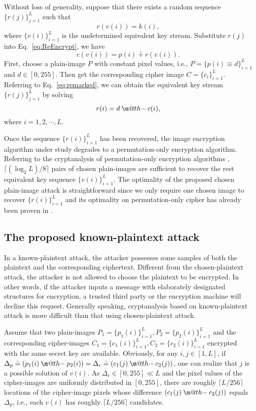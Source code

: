 \documentclass[smallextended, final]{svjour3}          \smartqed
\makeatletter
\newcommand{\dotminus}{\mathbin{\text{\@dotminus}}}
\newcommand{\@dotminus}{\ooalign{\hidewidth\raise1ex\hbox{.}\hidewidth\cr$\m@th-$\cr}}
\makeatother
\begin{document}
Without loss of generality, suppose that there exists a random sequence $\{r(j)\}_{j=1}^{L}$ such that
\begin{equation*}
r(v(i)) = k(i),
\end{equation*}
where $\{v(i)\}_{i=1}^{L}$ is the undetermined equivalent key stream. Substitute $r(j)$ into Eq.~\eqref{eq:ReEncrypt},
we have
\begin{equation}
\label{eq:remarked}
c(v(i)) = p(i) \dotplus r(v(i)).
\end{equation}
First, choose a plain-image $P$ with constant pixel values, i.e., $P = \{p(i)\equiv d\}_{i=1}^{L}$ and $d\in [0, 255]$. Then
get the corresponding cipher image $C=\{c_i\}_{i=1}^{L}$.
Referring to Eq.~\eqref{eq:remarked}, we can obtain the equivalent key stream $\{r(j)\}_{j=1}^{L}$ by solving
\begin{equation}
\nonumber
r(i) = d \dotminus c(i),
\end{equation}
where $i =1,2,\cdots, L$.

Once the sequence $\{r(i)\}_{i=1}^{L}$ has been recovered, the image encryption algorithm under study degrades to a
permutation-only encryption algorithm. Referring to the cryptanalysis
of permutation-only encryption algorithms \cite{li2008general, li2011optimal},
$\lceil (\log_2L)/8\rceil$ pairs of chosen plain-images are sufficient to recover the rest equivalent key sequence $\{v(i)\}_{i=1}^{L}$.
The optimality of the proposed chosen plain-image attack is straightforward since we only require one chosen image to recover $\{r(i)\}_{i=1}^{L}$
and its optimality on permutation-only cipher has already been proven in \cite{li2011optimal}.

\subsection{The proposed known-plaintext attack}
\label{subsec:kpa}
In a known-plaintext attack, the attacker possesses some samples of both the plaintext and the corresponding ciphertext.
Different from the chosen-plaintext attack, the attacker is not allowed to choose the plaintext to be encrypted.
In other words, if the attacker inputs a message with elaborately designated structures for encryption, a trusted third party or the encryption machine will decline this request.
Generally speaking, cryptanalysis based on known-plaintext attack is more difficult than that using chosen-plaintext attack.

Assume that two plain-images $P_1=\{p_1(i)\}_{i=1}^{L}, P_2=\{p_2(i)\}_{i=1}^{L}$
and the corresponding cipher-images $C_1=\{c_1(i)\}_{i=1}^{L}, C_2=\{c_2(i)\}_{i=1}^{L}$
encrypted with the same secret key are available.
Obviously, for any $i, j\in [1, L]$, if $\Delta_p \doteq (p_1(i)\dotminus p_2(i)) = \Delta_c \doteq (c_1(j)\dotminus c_2(j))$,
one can realize that $j$ is a possible solution of $v(i)$.
As $\Delta_c \in [0, 255] \ll L$ {and the pixel values of the cipher-images are uniformly distributed in $[0,255]$,
there are roughly $\lceil L/256 \rceil$ locations of the cipher-image pixels whose difference $(c_1(j)\dotminus c_2(j))$ equals $\Delta_p$},
i.e., each $v(i)$ has roughly $\lceil L/256 \rceil$ candidates.
\end{document}
